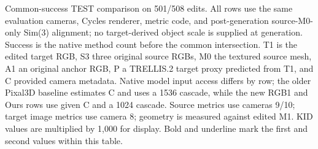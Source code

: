 \begin{table}[t]
\caption{Common-success TEST comparison on 501/508 edits. All rows use the same evaluation cameras, Cycles renderer, metric code, and post-generation source-M0-only Sim(3) alignment; no target-derived object scale is supplied at generation. Success is the native method count before the common intersection. T1 is the edited target RGB, S3 three original source RGBs, M0 the textured source mesh, A1 an original anchor RGB, P a TRELLIS.2 target proxy predicted from T1, and C provided camera metadata. Native model input access differs by row; the older Pixal3D baseline estimates C and uses a 1536 cascade, while the new RGB1 and Ours rows use given C and a 1024 cascade. Source metrics use cameras 9/10; target image metrics use camera 8; geometry is measured against edited M1. KID values are multiplied by 1,000 for display. Bold and underline mark the first and second values within this table.}
\label{tab:scale-ungiven-common-main}
\end{table}
